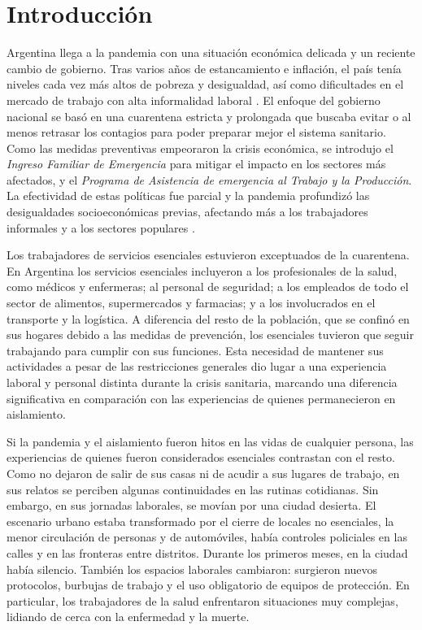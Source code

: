 
\begin{refsection}

\label{cap-29}


\section[Introducción]{Introducción}
\label{cap-29.introduccion}
Argentina llega a la pandemia con una situación económica delicada y un reciente cambio de gobierno. Tras varios años de estancamiento e inflación, el país tenía niveles cada vez más altos de pobreza y desigualdad, así como dificultades en el mercado de trabajo con alta informalidad laboral \protect\parencite{4219-DALLE2021}. El enfoque del gobierno nacional se basó en una cuarentena estricta y prolongada que buscaba evitar o al menos retrasar los contagios para poder preparar mejor el sistema sanitario. Como las medidas preventivas empeoraron la crisis económica, se introdujo el \emph{Ingreso Familiar de Emergencia} para mitigar el impacto en los sectores más afectados, y el \emph{Programa de Asistencia de emergencia al Trabajo y la Producción}. La efectividad de estas políticas fue parcial y la pandemia profundizó las desigualdades socioeconómicas previas, afectando más a los trabajadores informales y a los sectores populares \protect\parencite{4182-HEREDIA2022}.

Los trabajadores de servicios esenciales estuvieron exceptuados de la cuarentena. En Argentina los servicios esenciales incluyeron a los profesionales de la salud, como médicos y enfermeras; al personal de seguridad; a los empleados de todo el sector de alimentos, supermercados y farmacias; y a los involucrados en el transporte y la logística. A diferencia del resto de la población, que se confinó en sus hogares debido a las medidas de prevención, los esenciales tuvieron que seguir trabajando para cumplir con sus funciones. Esta necesidad de mantener sus actividades a pesar de las restricciones generales dio lugar a una experiencia laboral y personal distinta durante la crisis sanitaria, marcando una diferencia significativa en comparación con las experiencias de quienes permanecieron en aislamiento.

Si la pandemia y el aislamiento fueron hitos en las vidas de cualquier persona, las experiencias de quienes fueron considerados esenciales contrastan con el resto. Como no dejaron de salir de sus casas ni de acudir a sus lugares de trabajo, en sus relatos se perciben algunas continuidades en las rutinas cotidianas. Sin embargo, en sus jornadas laborales, se movían por una ciudad desierta. El escenario urbano estaba transformado por el cierre de locales no esenciales, la menor circulación de personas y de automóviles, había controles policiales en las calles y en las fronteras entre distritos. Durante los primeros meses, en la ciudad había silencio. También los espacios laborales cambiaron: surgieron nuevos protocolos, burbujas de trabajo y el uso obligatorio de equipos de protección. En particular, los trabajadores de la salud enfrentaron situaciones muy complejas, lidiando de cerca con la enfermedad y la muerte.


\end{refsection}
